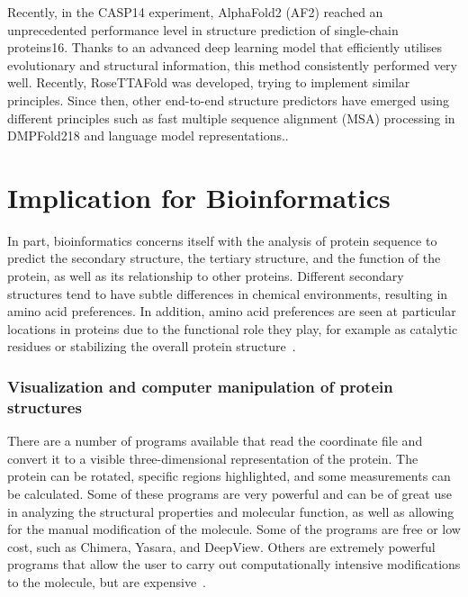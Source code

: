 \documentclass{report}
\begin{document}
Recently, in the CASP14 experiment, AlphaFold2 (AF2) reached an unprecedented performance level in structure prediction of single-chain proteins16. Thanks to an advanced deep learning model that efficiently utilises evolutionary and structural information, this method consistently performed very well. Recently, RoseTTAFold was developed, trying to implement similar principles. Since then, other end-to-end structure predictors have emerged using different principles such as fast multiple sequence alignment (MSA) processing in DMPFold218 and language model representations.\cite{bryant_improved_2022}.

\section{Implication for Bioinformatics}

In part, bioinformatics concerns itself with the analysis of protein sequence to predict the secondary structure, the tertiary structure, and the function of the protein, as well as its relationship to other proteins. Different secondary structures tend to have subtle differences in chemical environments, resulting in amino acid preferences. In addition, amino acid preferences are seen at particular locations in proteins due to the functional role they play, for example as catalytic residues or stabilizing the overall protein structure~\cite{zvelebil_understanding_2008}.

\subsubsection{Visualization and computer manipulation of protein structures}

There are a number of programs available that read the coordinate file and convert it to a visible three-dimensional representation of the protein. The protein can be rotated, specific regions highlighted, and some measurements can be calculated. Some of these programs are very powerful and can be of great use in analyzing the structural properties and molecular function, as well as allowing for the manual modification of the molecule. Some of the programs are free or low cost, such as Chimera, Yasara, and DeepView. Others are extremely powerful programs that allow the user to carry out computationally intensive modifications to the molecule, but are expensive~\cite{zvelebil_understanding_2008}.




\end{document}
